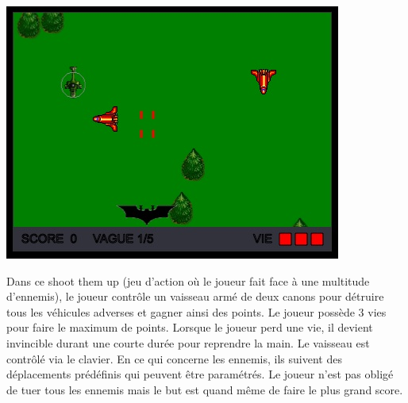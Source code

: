 \begin{minipage}{6cm}
\includegraphics[width=\linewidth]{img/capturejeu_1942}
\end{minipage}
\hfill
\begin{minipage}{9cm}
Dans ce shoot them up (jeu d’action où le joueur fait face à une multitude d’ennemis), 
le joueur contrôle un vaisseau armé de deux canons pour détruire tous les véhicules adverses et gagner ainsi des points. 
Le joueur possède 3 vies pour faire le maximum de points. Lorsque le joueur perd une vie, il devient invincible durant une courte durée 
pour reprendre la main. Le vaisseau est contrôlé via le clavier. En ce qui concerne les ennemis, 
ils suivent des déplacements prédéfinis qui peuvent être paramétrés. 
Le joueur n’est pas obligé de tuer tous les ennemis mais le but est quand même de faire le plus grand score.
\end{minipage}

